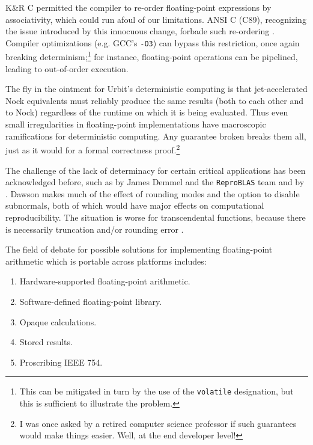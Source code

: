 \documentclass[twoside]{article}
\begin{document}
K\&R C permitted the compiler to re-order floating-point expressions by associativity, which could run afoul of our limitations.  ANSI C (C89), recognizing the issue introduced by this innocuous change, forbade such re-ordering \citep{MacDonald1991}.  Compiler optimizations (e.g. GCC's \texttt{-O3}) can bypass this restriction, once again breaking determinism;\footnote{This can be mitigated in turn by the use of the \texttt{volatile} designation, but this is sufficient to illustrate the problem.} for instance, floating-point operations can be pipelined, leading to out-of-order execution.

The fly in the ointment for Urbit's deterministic computing is that jet-accelerated Nock equivalents must reliably produce the same results (both to each other and to Nock) regardless of the runtime on which it is being evaluated.  Thus even small irregularities in floating-point implementations have macroscopic ramifications for deterministic computing.  Any guarantee broken breaks them all, just as it would for a formal correctness proof.\footnote{I was once asked by a retired computer science professor if such guarantees would make things easier.  Well, at the end developer level!}

The challenge of the lack of determinacy for certain critical applications has been acknowledged before, such as by James Demmel and the \texttt{ReproBLAS} team \citep{Demmel2017, ReproBLAS} and by \citeauthor{Dawson2013}.  Dawson makes much of the effect of rounding modes and the option to disable subnormals, both of which would have major effects on computational reproducibility.  The situation is worse for transcendental functions, because there is necessarily truncation and/or rounding error \citep{Dawson2013}.

The field of debate for possible solutions for implementing floating-point arithmetic which is portable across platforms includes:

\begin{enumerate}
  \item  Hardware-supported floating-point arithmetic.
  \item  Software-defined floating-point library.
  \item  Opaque calculations.
  \item  Stored results.
  \item  Proscribing IEEE 754.
\end{enumerate}
\end{document}

